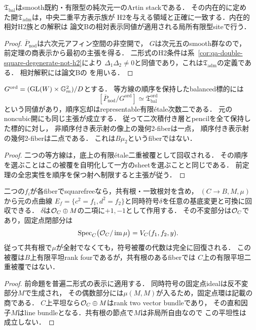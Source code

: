 \begin{corollary}
\label{cor:qa-tf-h2-admissible-open}
$\mathfrak T_{\mathrm{bal}}$はsmooth既約・有限型の純次元一のArtin stackである．
その内在的に定めた開$\mathfrak T_{\mathrm{adm}}$は，中央二重平方表示族が
H2を与える領域と正確に一致する．内在的相対H2族との解釈は
論文Bの相対表示同値が適用される局所有限型siteで行う．
\end{corollary}
\begin{proof}
$\overline P_{\mathrm{nod}}$は六次元アフィン空間の非空開で，
$G$は次元五のsmooth群なので，前定理の商表示から最初の主張を得る．
二形式のH2条件は系~\ref{cor:qa-double-square-degenerate-not-h2}により
$\Delta_1\Delta_2\ne0$と同値であり，これは$\mathfrak T_{\mathrm{adm}}$の定義である．
相対解釈には論文Bの
\cite[\texttt{thm:noncubic-intrinsic-presentation-equivalence}]{QuadricModuli2026}
を用いる．
\end{proof}

\begin{corollary}[順序付けと表示射の幾何fiber]
\label{cor:qa-tf-ordered-double-cover}
$G^{\mathrm{ord}}=(\operatorname{GL}(W)\times\mathbb G_m^2)/D$とする．
等方線の順序を保持したbalanced標的には
\[
 [\overline P_{\mathrm{nod}}/G^{\mathrm{ord}}]
       \simeq\mathfrak T_{\mathrm{bal}}^{\mathrm{ord}}
\]
という同値があり，順序忘却はrepresentable有限\'etale次数二である．
元のnoncubic開にも同じ主張が成立する．
従って二次積付き層とpencilを全て保持した標的に対し，
非順序付き表示射の像上の幾何2-fiberは一点，
順序付き表示射の幾何2-fiberは二点である．
これは$B\mu_2$というfiberではない．
\end{corollary}
\begin{proof}
二つの等方線は，底上の有限\'etale二重被覆として回収される．
その順序を選ぶことはこの被覆を自明化して一方のsheetを選ぶことと同じである．
前定理の全忠実性を順序を保つ射へ制限すると主張が従う．
\end{proof}


\begin{corollary}[全noncubic境界での元の符号被覆の回収]
\label{cor:qa-tf-original-point-cover-reconstruction}
二つの$f_i$が各fiberでsquarefreeなら，共有根・一致根対を含め，
$(C\to B,M,\mu)$から元の点曲線
$E_f=\{c^2=f_1,d^2=f_2\}$と同時符号$\delta$を任意の基底変更と可換に回収できる．
$\delta$は$\mathcal O_C\oplus M$の二項に$+1,-1$として作用する．
その不変部分は$\mathcal O_C$であり，固定点閉部分は
\[
 \operatorname{Spec}_C\bigl(\mathcal O_C/\operatorname{im}\mu\bigr)
 =V_C(f_1,f_2,y).
\]
従って共有根で$\mu$が全射でなくても，符号被覆の代数は完全に回復される．
この被覆は$B$上有限平坦rank fourであるが，共有根のあるfiberでは
$C$上の有限平坦二重被覆ではない．
\end{corollary}
\begin{proof}
前命題を普遍二形式の表示に適用する．
同時符号の固定点idealは反不変部分$M$で生成され，
その偶数部分には$\mu(M,M)$が入るため，固定点環は記載の商である．
$C$上平坦なら$\mathcal O_C\oplus M$はrank two vector bundleであり，
その直和因子$M$はline bundleとなる．共有根の節点で$M$は非局所自由なので
この平坦性は成立しない．
\end{proof}


